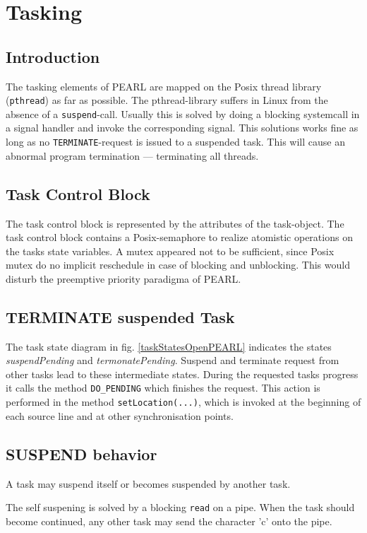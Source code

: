 \section{Tasking}


\subsection{Introduction}
The tasking elements of PEARL are mapped on the Posix thread library 
(\verb|pthread|) as far as possible. 
The pthread-library suffers in Linux from the absence of a \verb|suspend|-call.
Usually this is solved by doing a blocking systemcall in a signal handler and
invoke the corresponding signal.
This solutions works fine as long as no \verb|TERMINATE|-request is
issued to a suspended task. This will cause an abnormal program
termination --- terminating all threads. 


\subsection{Task Control Block}
The task control block is represented by the attributes of the 
task-object. 
The task control block contains a Posix-semaphore to realize atomistic
operations on the tasks state variables.
A mutex appeared not to be sufficient, since
Posix mutex do no implicit reschedule in case of blocking and unblocking.
This would disturb the preemptive priority  paradigma of PEARL.

\subsection{TERMINATE suspended Task}
The task state diagram in  fig. \ref{taskStatesOpenPEARL} indicates the states
{\em suspendPending} and {\em termonatePending}.
Suspend and terminate request from other tasks lead to these
 intermediate states.
During the requested tasks progress it calls the method \verb|DO_PENDING| which
finishes the request. This action is performed in the method 
\verb|setLocation(...)|, which is invoked at the beginning of each source line
and at other synchronisation points.


\subsection{SUSPEND behavior}
A task may suspend itself or becomes suspended by another task.

The self suspening is solved by a blocking \verb|read| on a pipe.
When the task should become continued,
 any other task may send the character 'c' onto the pipe.


